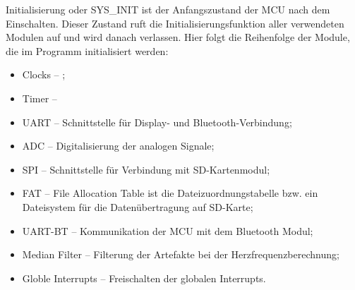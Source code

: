 Initialisierung oder SYS\_INIT ist der Anfangszustand der MCU nach dem Einschalten. Dieser Zustand ruft die Initialisierungsfunktion aller verwendeten Modulen auf und wird danach verlassen. Hier folgt die Reihenfolge der Module, die im Programm initialisiert werden:
\begin{itemize}

    \item Clocks – ;
    \item Timer – 
    \item UART – Schnittstelle für Display- und Bluetooth-Verbindung;
    \item ADC – Digitalisierung der analogen Signale;
    \item SPI – Schnittstelle für Verbindung mit SD-Kartenmodul;
    \item FAT – File Allocation Table ist die Dateizuordnungstabelle bzw. ein Dateisystem für die Datenübertragung auf SD-Karte;
    \item UART-BT – Kommunikation der MCU mit dem Bluetooth Modul;
    \item Median Filter – Filterung der Artefakte bei der Herzfrequenzberechnung;
    \item Globle Interrupts – Freischalten der globalen Interrupts.
\end{itemize}

